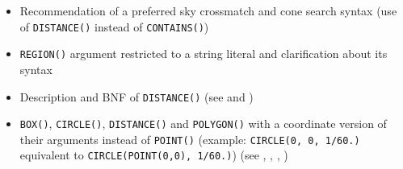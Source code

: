\documentclass[11pt,a4paper]{ivoa}
\begin{document}
\begin{itemize}
\begin{itemize}
\begin{itemize}
                          spherical
                          (see  and
                          )
                    \item Recommendation of a preferred sky crossmatch and
                          cone search syntax (use
                          of \verb:DISTANCE(): instead of \verb:CONTAINS():)
                    \item \verb:REGION(): argument restricted to a string
                          literal and clarification about its syntax
                    \item Description and BNF of \verb:DISTANCE():
                          (see  and
                          )
                    \item \verb:BOX():, \verb:CIRCLE():, \verb:DISTANCE(): and
                          \verb:POLYGON(): with a coordinate version of their
                          arguments instead of \verb:POINT(): (example:
                          \verb:CIRCLE(0, 0, 1/60.): equivalent to
                          \verb:CIRCLE(POINT(0,0), 1/60.):)
                          (see ,
                          ,
                          ,
                          )
                \end{itemize}
        \end{itemize}
\end{itemize}

\clearpage %

\end{document}
